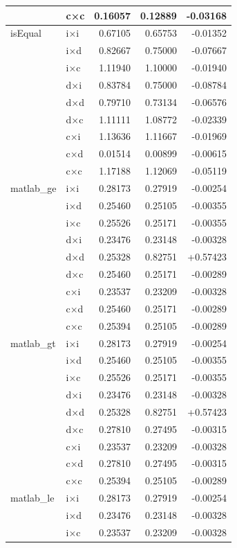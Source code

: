 \begin{longtable}{l l r r r}
   & c×c & 0.16057 & 0.12889 & -0.03168 \\
\midrule
  isEqual & i×i & 0.67105 & 0.65753 & -0.01352 \\
   & i×d & 0.82667 & 0.75000 & -0.07667 \\
   & i×c & 1.11940 & 1.10000 & -0.01940 \\
   & d×i & 0.83784 & 0.75000 & -0.08784 \\
   & d×d & 0.79710 & 0.73134 & -0.06576 \\
   & d×c & 1.11111 & 1.08772 & -0.02339 \\
   & c×i & 1.13636 & 1.11667 & -0.01969 \\
   & c×d & 0.01514 & 0.00899 & -0.00615 \\
   & c×c & 1.17188 & 1.12069 & -0.05119 \\
\midrule
  matlab\_ge & i×i & 0.28173 & 0.27919 & -0.00254 \\
   & i×d & 0.25460 & 0.25105 & -0.00355 \\
   & i×c & 0.25526 & 0.25171 & -0.00355 \\
   & d×i & 0.23476 & 0.23148 & -0.00328 \\
   & d×d & 0.25328 & 0.82751 & +0.57423 \\
   & d×c & 0.25460 & 0.25171 & -0.00289 \\
   & c×i & 0.23537 & 0.23209 & -0.00328 \\
   & c×d & 0.25460 & 0.25171 & -0.00289 \\
   & c×c & 0.25394 & 0.25105 & -0.00289 \\
\midrule
  matlab\_gt & i×i & 0.28173 & 0.27919 & -0.00254 \\
   & i×d & 0.25460 & 0.25105 & -0.00355 \\
   & i×c & 0.25526 & 0.25171 & -0.00355 \\
   & d×i & 0.23476 & 0.23148 & -0.00328 \\
   & d×d & 0.25328 & 0.82751 & +0.57423 \\
   & d×c & 0.27810 & 0.27495 & -0.00315 \\
   & c×i & 0.23537 & 0.23209 & -0.00328 \\
   & c×d & 0.27810 & 0.27495 & -0.00315 \\
   & c×c & 0.25394 & 0.25105 & -0.00289 \\
\midrule
  matlab\_le & i×i & 0.28173 & 0.27919 & -0.00254 \\
   & i×d & 0.23476 & 0.23148 & -0.00328 \\
   & i×c & 0.23537 & 0.23209 & -0.00328 \\

\end{longtable}
